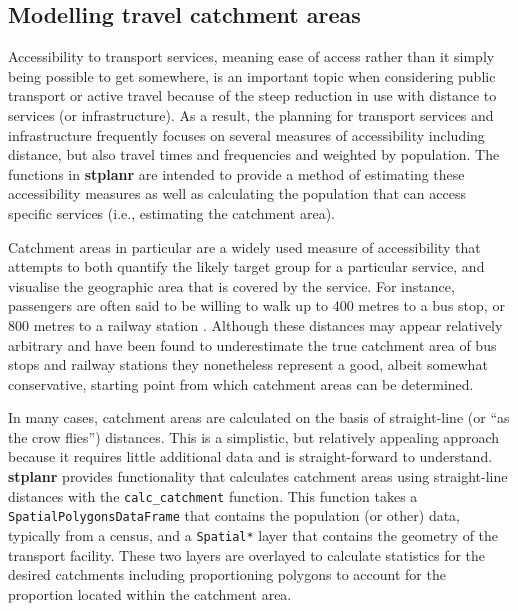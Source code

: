 \subsection{Modelling travel catchment
areas}\label{modelling-travel-catchment-areas}

Accessibility to transport services, meaning ease of access rather than
it simply being possible to get somewhere, is an important topic
when considering public transport or active travel because of the
steep reduction in use with distance to services (or
infrastructure). As a result, the planning for transport
services and infrastructure frequently focuses on several measures of
accessibility including distance, but also travel times and frequencies
and weighted by population. The functions in \textbf{stplanr} are
intended to provide a method of estimating these accessibility measures
as well as calculating the population that can access specific services
(i.e., estimating the catchment area).

Catchment areas in particular are a widely used measure of accessibility
that attempts to both quantify the likely target group for a particular
service, and visualise the geographic area that is covered by the
service. For instance, passengers are often said to be willing to walk
up to 400 metres to a bus stop, or 800 metres to a railway station
\citep{el-geneidy_new_2014}. Although these distances may appear
relatively arbitrary and have been found to underestimate the true
catchment area of bus stops and railway stations
\citep{el-geneidy_new_2014,daniels_explaining_2013} they nonetheless
represent a good, albeit somewhat conservative, starting point from
which catchment areas can be determined.

In many cases, catchment areas are calculated on the basis of
straight-line (or ``as the crow flies'') distances. This is a
simplistic, but relatively appealing approach because it requires little
additional data and is straight-forward to understand. \textbf{stplanr}
provides functionality that calculates catchment areas using
straight-line distances with the \texttt{calc\_catchment} function. This
function takes a \texttt{SpatialPolygonsDataFrame} that contains the
population (or other) data, typically from a census, and a
\texttt{Spatial*} layer that contains the geometry of the transport
facility. These two layers are overlayed to calculate statistics for the
desired catchments including proportioning polygons to account for the
proportion located within the catchment area.

